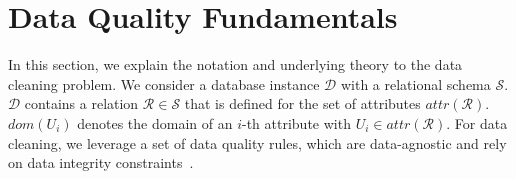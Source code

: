 \section{Data Quality Fundamentals}
\label{sec:expl}
In this section, we explain the notation and underlying theory to the data cleaning problem. We consider a database instance $\mathcal{D}$ with a relational schema $\mathcal{S}$. $\mathcal{D}$ contains a relation $\mathcal{R} \in \mathcal{S}$ that is defined for the set of attributes $attr(\mathcal{R})$. $dom(U_i)$ denotes the domain of an $i$-th attribute with $U_i \in attr(\mathcal{R})$. For data cleaning, we leverage a set of data quality rules, which are data-agnostic and rely on data integrity constraints~\cite{AbiteboulHV95, fan2012foundations}.

